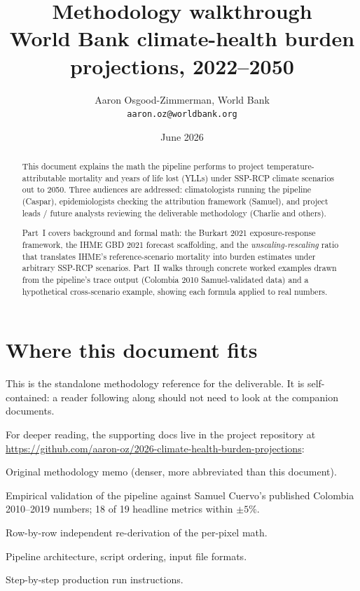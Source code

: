 \documentclass[11pt]{article}
\title{Methodology walkthrough \\
\large World Bank climate-health burden projections, 2022--2050}
\author{Aaron Osgood-Zimmerman, World Bank \\ \texttt{aaron.oz@worldbank.org}}
\date{June 2026}
\begin{document}
\maketitle

\begin{abstract}
\noindent
This document explains the math the pipeline performs to project
temperature-attributable mortality and years of life lost (YLLs) under
SSP-RCP climate scenarios out to 2050. Three audiences are addressed:
climatologists running the pipeline (Caspar), epidemiologists checking the
attribution framework (Samuel), and project leads / future analysts
reviewing the deliverable methodology (Charlie and others).

Part~I covers background and formal math: the Burkart 2021 exposure-response
framework, the IHME GBD 2021 forecast scaffolding, and the
\emph{unscaling-rescaling} ratio that translates IHME's reference-scenario
mortality into burden estimates under arbitrary SSP-RCP scenarios. Part~II
walks through concrete worked examples drawn from the pipeline's trace
output (Colombia 2010 Samuel-validated data) and a hypothetical
cross-scenario example, showing each formula applied to real numbers.
\end{abstract}

\tableofcontents

\section{Where this document fits}

This is the standalone methodology reference for the deliverable. It is
self-contained: a reader following along should not need to look at the
companion documents.

For deeper reading, the supporting docs live in the project repository
at \url{https://github.com/aaron-oz/2026-climate-health-burden-projections}:
\begin{description}[style=multiline,leftmargin=4.2cm]
  \item[\texttt{gbd/ihme-plan-b-prep.tex}] Original methodology memo
    (denser, more abbreviated than this document).
  \item[\texttt{colombia-validation-state.tex}] Empirical validation of
    the pipeline against Samuel Cuervo's published Colombia 2010--2019
    numbers; 18 of 19 headline metrics within $\pm 5\%$.
  \item[\texttt{pipeline-math-verification.md}] Row-by-row independent
    re-derivation of the per-pixel math.
  \item[\texttt{pipeline-state-for-cckp.md}] Pipeline architecture,
    script ordering, input file formats.
  \item[\texttt{caspar-workflow.md}] Step-by-step production run
    instructions.
\end{description}
\end{document}
